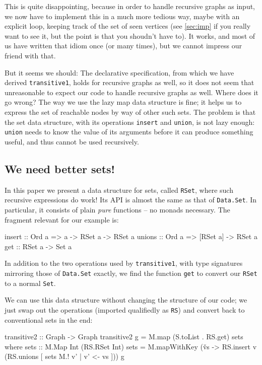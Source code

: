 \documentclass[manuscript,anonymous,screen,acmsmall]{acmart}
\begin{document}
This is quite disappointing, because in order to handle recursive graphs as input, we now have to implement this in a much more tedious way, maybe with an explicit loop, keeping track of the set of seen vertices (see \cref{sec:imp} if you really want to see it, but the point is that you shoudn’t have to). It works, and most of us have written that idiom once (or many times), but we cannot impress our friend with that.

But it seems we should: The declarative specification, from which we have derived \verb|transitive1|, holds for recursive graphs as well, so it does not seem that unreasonable to expect our code to handle recursive graphs as well. Where does it go wrong? The way we use the lazy map data structure is fine; it helps us to express the set of reachable nodes by way of other such sets.
The problem is that the set data structure, with its operations \verb|insert| and \verb|union|, is not lazy enough: \verb|union| needs to know the value of its arguments before it can produce something useful, and thus cannot be used recursively.

\subsection{We need better sets!}

In this paper we present a data structure for sets, called \verb|RSet|, where such recursive expressions do work! Its API is almost the same as that of \verb|Data.Set|. In particular, it consists of plain \emph{pure} functions -- no monads necessary. The fragment relevant for our example is:
\begin{code}
insert  :: Ord a =>  a -> RSet a  -> RSet a
unions  :: Ord a =>  [RSet a]     -> RSet a
get     ::           RSet a       -> Set a
\end{code}
In addition to the two operations used by \verb|transitive1|, with type signatures mirroring those of \verb|Data.Set| exactly, we find the function \verb|get| to convert our \verb|RSet| to a normal \verb|Set|.

We can use this data structure without changing the structure of our code; we just swap out the operations (imported qualifiedly as \verb|RS|) and convert back to conventional sets in the end:
\begin{code}
transitive2 :: Graph -> Graph
transitive2 g = M.map (S.toList . RS.get) sets
  where
    sets :: M.Map Int (RS.RSet Int)
    sets = M.mapWithKey (\v vs -> RS.insert v (RS.unions [ sets M.! v' | v' <- vs ])) g
\end{code}
\end{document}
